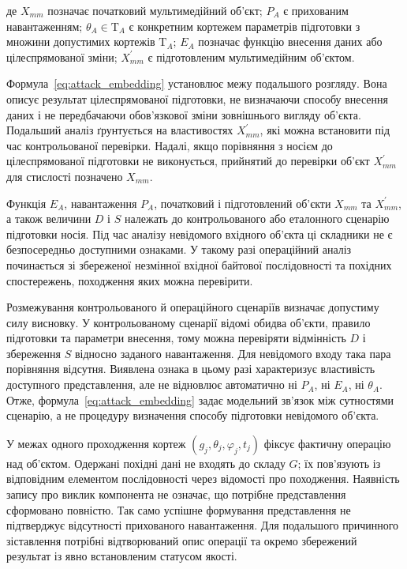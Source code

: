 де $X_{mm}$ позначає початковий мультимедійний об’єкт; $P_A$ є прихованим навантаженням; $\theta_A\in\mathrm T_A$ є конкретним кортежем параметрів підготовки з множини допустимих кортежів $\mathrm T_A$; $E_A$ позначає функцію внесення даних або цілеспрямованої зміни; $X_{mm}^{\prime}$ є підготовленим мультимедійним об’єктом.

Формула~\eqref{eq:attack_embedding} установлює межу подальшого розгляду. Вона описує результат цілеспрямованої підготовки, не визначаючи способу внесення даних і не передбачаючи обов’язкової зміни зовнішнього вигляду об’єкта. Подальший аналіз ґрунтується на властивостях $X_{mm}^{\prime}$, які можна встановити під час контрольованої перевірки. Надалі, якщо порівняння з носієм до цілеспрямованої підготовки не виконується, прийнятий до перевірки об’єкт $X_{mm}^{\prime}$ для стислості позначено $X_{mm}$.

Функція $E_A$, навантаження $P_A$, початковий і підготовлений об’єкти $X_{mm}$ та $X_{mm}^{\prime}$, а також величини $D$ і $S$ належать до контрольованого або еталонного сценарію підготовки носія. Під час аналізу невідомого вхідного об’єкта ці складники не є безпосередньо доступними ознаками. У такому разі операційний аналіз починається зі збереженої незмінної вхідної байтової послідовності та похідних спостережень, походження яких можна перевірити.

Розмежування контрольованого й операційного сценаріїв визначає допустиму силу висновку. У контрольованому сценарії відомі обидва об’єкти, правило підготовки та параметри внесення, тому можна перевіряти відмінність $D$ і збереження $S$ відносно заданого навантаження. Для невідомого входу така пара порівняння відсутня. Виявлена ознака в цьому разі характеризує властивість доступного представлення, але не відновлює автоматично ні $P_A$, ні $E_A$, ні $\theta_A$. Отже, формула~\eqref{eq:attack_embedding} задає модельний зв’язок між сутностями сценарію, а не процедуру визначення способу підготовки невідомого об’єкта.

У межах одного проходження кортеж $(g_j,\theta_j,\varphi_j,t_j)$ фіксує фактичну операцію над об’єктом. Одержані похідні дані не входять до складу $G$; їх пов’язують із відповідним елементом послідовності через відомості про походження. Наявність запису про виклик компонента не означає, що потрібне представлення сформовано повністю. Так само успішне формування представлення не підтверджує відсутності прихованого навантаження. Для подальшого причинного зіставлення потрібні відтворюваний опис операції та окремо збережений результат із явно встановленим статусом якості.

